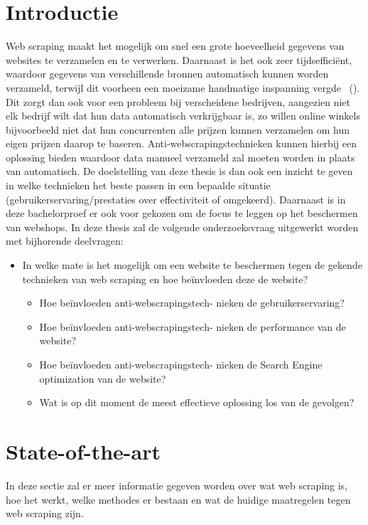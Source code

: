 
\section{Introductie}%
\label{sec:introductie}

Web scraping maakt het mogelijk om snel een grote hoeveelheid gegevens van websites te verzamelen en te verwerken. Daarnaast is het ook zeer tijdsefficiënt, waardoor gegevens van verschillende bronnen automatisch kunnen worden verzameld, terwijl dit voorheen een moeizame handmatige inspanning vergde ~(\cite{NYLEN2017277}). Dit zorgt dan ook voor een probleem bij verscheidene bedrijven, aangezien niet elk bedrijf wilt dat hun data automatisch verkrijgbaar is, zo willen online winkels bijvoorbeeld niet dat hun concurrenten alle prijzen kunnen verzamelen om hun eigen prijzen daarop te baseren. Anti-webscrapingstechnieken kunnen hierbij een oplossing bieden waardoor data manueel verzameld zal moeten worden in plaats van automatisch. De doelstelling van deze thesis is dan ook een inzicht te geven in welke technieken het beste passen in een bepaalde situatie (gebruikerservaring/prestaties over effectiviteit of omgekeerd). Daarnaast is in deze bachelorproef er ook voor gekozen om de focus te leggen op het beschermen van webshops.
\newline
In deze thesis zal de volgende onderzoeksvraag uitgewerkt worden met bijhorende deelvragen:
\begin{itemize}
\item In welke mate is het mogelijk om een website te beschermen tegen de gekende technieken van web scraping en hoe beïnvloeden deze de website?
    \begin{itemize}
    \item Hoe beïnvloeden anti-webscrapingstech- nieken de gebruikerservaring?
    \item Hoe beïnvloeden anti-webscrapingstech- nieken de performance van de website?
    \item Hoe beïnvloeden anti-webscrapingstech- nieken de Search Engine optimization van de website?
    \item Wat is op dit moment de meest effectieve oplossing los van de gevolgen?
    \end{itemize}
\end{itemize}

\section{State-of-the-art}%
\label{sec:state-of-the-art}
In deze sectie zal er meer informatie gegeven worden over wat web scraping is, hoe het werkt, welke methodes er bestaan en wat de huidige maatregelen tegen web scraping zijn.
